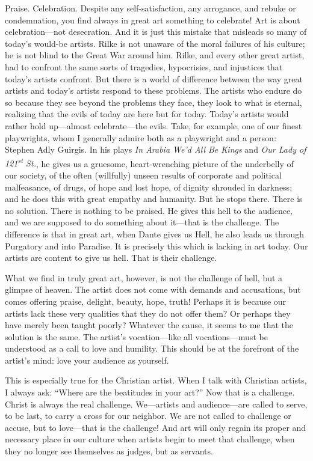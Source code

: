 \documentclass[letterpaper]{article}
\begin{document}
Praise. Celebration. Despite any self-satisfaction, any arrogance, and
rebuke or condemnation, you find always in great art something to
celebrate! Art is about celebration---not desecration. And it is just
this mistake that misleads so many of today's would-be artists. Rilke
is not unaware of the moral failures of his culture; he is not blind
to the Great War around him. Rilke, and every other great artist, had
to confront the same sorts of tragedies, hypocrisies, and injustices
that today's artists confront. But there is a world of difference
between the way great artists and today's artists respond to these
problems. The artists who endure do so because they see beyond the
problems they face, they look to what is eternal, realizing that the
evils of today are here but for today. Today's artists would rather
hold up---almost celebrate---the evils. Take, for example, one of our
finest playwrights, whom I generally admire both as a playwright and a
person: Stephen Adly Guirgis. In his plays \emph{In Arabia We'd All Be
  Kings} and \emph{Our Lady of 121\textsuperscript{st} St.}, he gives
us a gruesome, heart-wrenching picture of the underbelly of our
society, of the often (willfully) unseen results of corporate and
political malfeasance, of drugs, of hope and lost hope, of dignity
shrouded in darkness; and he does this with great empathy and
humanity. But he stops there. There is no solution. There is nothing
to be praised. He gives this hell to the audience, and we are supposed
to do something about it---that is the challenge. The difference is
that in great art, when Dante gives us Hell, he also leads us through
Purgatory and into Paradise. It is precisely this which is lacking in
art today. Our artists are content to give us hell. That is their
challenge.

What we find in truly great art, however, is not the challenge of
hell, but a glimpse of heaven. The artist does not come with demands
and accusations, but comes offering praise, delight, beauty, hope,
truth! Perhaps it is because our artists lack these very qualities
that they do not offer them? Or perhaps they have merely been taught
poorly? Whatever the cause, it seems to me that the solution is the
same. The artist's vocation---like all vocations---must be understood
as a call to love and humility. This should be at the forefront of the
artist's mind: love your audience as yourself.

This is especially true for the Christian artist. When I talk with
Christian artists, I always ask: ``Where are the beatitudes in your
art?'' Now that is a challenge. Christ is always the real
challenge. We---artists and audience---are called to serve, to be
last, to carry a cross for our neighbor. We are not called to
challenge or accuse, but to love---that is the challenge! And art will
only regain its proper and necessary place in our culture when artists
begin to meet that challenge, when they no longer see themselves as
judges, but as servants.
\end{document}
